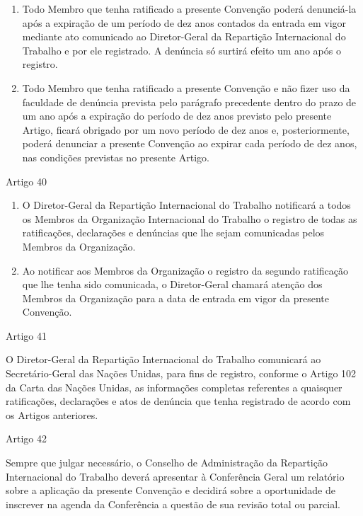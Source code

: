\documentclass[
]{book}
\begin{document}
\begin{enumerate}
\def\labelenumi{\arabic{enumi}.}
\item
  Todo Membro que tenha ratificado a presente Convenção poderá denunciá-la após a expiração de um período de dez anos contados da entrada em vigor mediante ato comunicado ao Diretor-Geral da Repartição Internacional do Trabalho e por ele registrado. A denúncia só surtirá efeito um ano após o registro.
\item
  Todo Membro que tenha ratificado a presente Convenção e não fizer uso da faculdade de denúncia prevista pelo parágrafo precedente dentro do prazo de um ano após a expiração do período de dez anos previsto pelo presente Artigo, ficará obrigado por um novo período de dez anos e, posteriormente, poderá denunciar a presente Convenção ao expirar cada período de dez anos, nas condições previstas no presente Artigo.
\end{enumerate}

Artigo 40

\begin{enumerate}
\def\labelenumi{\arabic{enumi}.}
\item
  O Diretor-Geral da Repartição Internacional do Trabalho notificará a todos os Membros da Organização Internacional do Trabalho o registro de todas as ratificações, declarações e denúncias que lhe sejam comunicadas pelos Membros da Organização.
\item
  Ao notificar aos Membros da Organização o registro da segundo ratificação que lhe tenha sido comunicada, o Diretor-Geral chamará atenção dos Membros da Organização para a data de entrada em vigor da presente Convenção.
\end{enumerate}

Artigo 41

O Diretor-Geral da Repartição Internacional do Trabalho comunicará ao Secretário-Geral das Nações Unidas, para fins de registro, conforme o Artigo 102 da Carta das Nações Unidas, as informações completas referentes a quaisquer ratificações, declarações e atos de denúncia que tenha registrado de acordo com os Artigos anteriores.

Artigo 42

Sempre que julgar necessário, o Conselho de Administração da Repartição Internacional do Trabalho deverá apresentar à Conferência Geral um relatório sobre a aplicação da presente Convenção e decidirá sobre a oportunidade de inscrever na agenda da Conferência a questão de sua revisão total ou parcial.
\end{document}
